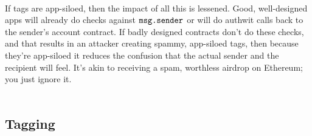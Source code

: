 \noindent\\
If tags are app-siloed, then the impact of all this is lessened.
Good, well-designed apps will already do checks against $\code{msg.sender}$ or will do authwit calls back to the sender's account contract.
If badly designed contracts don't do these checks, and that results in an attacker creating spammy, app-siloed tags, then because they're app-siloed it reduces the confusion that the actual sender and the recipient will feel.
It's akin to receiving a spam, worthless airdrop on Ethereum; you just ignore it.\\
\\





\subsection{Tagging}


